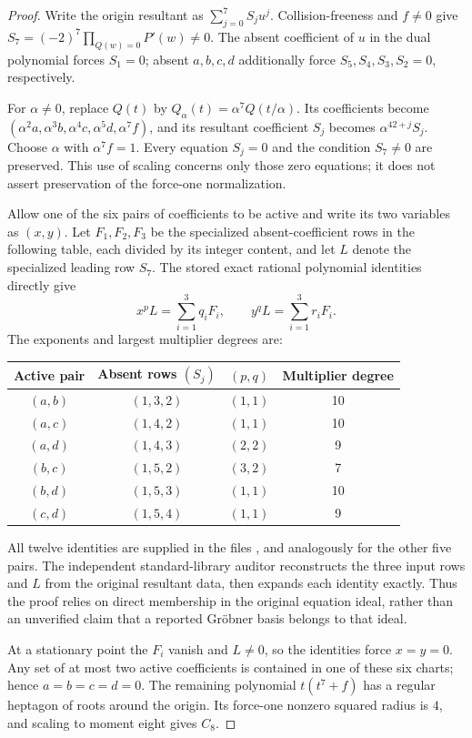 \documentclass[11pt]{article}
\theoremstyle{remark}
\numberwithin{equation}{section}
\begin{document}
\begin{proof}
Write the origin resultant as $\sum_{j=0}^7S_ju^j$.
Collision-freeness and $f\ne0$ give
$S_7=(-2)^7\prod_{Q(w)=0}P'(w)\ne0$.
The absent coefficient of $u$ in the dual polynomial forces $S_1=0$;
absent $a,b,c,d$ additionally force $S_5,S_4,S_3,S_2=0$, respectively.

For $\alpha\ne0$, replace $Q(t)$ by
$Q_\alpha(t)=\alpha^7Q(t/\alpha)$. Its coefficients become
$(\alpha^2a,\alpha^3b,\alpha^4c,\alpha^5d,\alpha^7f)$,
and its resultant coefficient $S_j$ becomes $\alpha^{42+j}S_j$.
Choose $\alpha$ with $\alpha^7f=1$. Every equation $S_j=0$ and
the condition $S_7\ne0$ are preserved. This use of scaling
concerns only those zero equations;
it does not assert preservation of the force-one normalization.

Allow one of the six pairs of coefficients to be active and write
its two variables as $(x,y)$. Let $F_1,F_2,F_3$ be the specialized
absent-coefficient rows in the following table, each divided by its
integer content, and let $L$ denote the specialized leading row $S_7$.
The stored exact rational polynomial identities directly give
\[
 x^pL=\sum_{i=1}^3q_iF_i,\qquad
 y^qL=\sum_{i=1}^3r_iF_i.
\]
The exponents and largest multiplier degrees are:
\begin{center}
\begin{tabular}{cccc}
\toprule
Active pair&Absent rows $(S_j)$&$(p,q)$&Multiplier degree\\
\midrule
$(a,b)$&$(1,3,2)$&$(1,1)$&10\\
$(a,c)$&$(1,4,2)$&$(1,1)$&10\\
$(a,d)$&$(1,4,3)$&$(2,2)$&9\\
$(b,c)$&$(1,5,2)$&$(3,2)$&7\\
$(b,d)$&$(1,5,3)$&$(1,1)$&10\\
$(c,d)$&$(1,5,4)$&$(1,1)$&9\\
\bottomrule
\end{tabular}
\end{center}
All twelve identities are supplied in the files
, and analogously for
the other five pairs. The independent standard-library auditor
 reconstructs the three
input rows and $L$ from the original resultant data, then expands
each identity exactly. Thus the proof relies on direct membership
in the original equation ideal, rather than an unverified claim that
a reported Gr\"obner basis belongs to that ideal.

At a stationary point the $F_i$ vanish and $L\ne0$, so the identities
force $x=y=0$. Any set of at most two active coefficients is contained
in one of these six charts; hence $a=b=c=d=0$.
The remaining polynomial $t(t^7+f)$ has a regular heptagon of roots
around the origin. Its force-one nonzero squared radius is $4$, and
scaling to moment eight gives $C_8$.
\end{proof}
\end{document}
